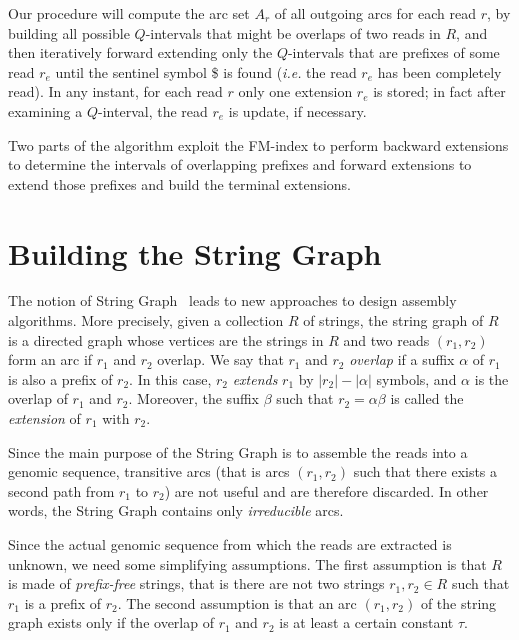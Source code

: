 \documentclass[runningheads,envcountsame,a4paper]{llncs}
\newcommand{\ie}{\textit{i.e.}\xspace}
\begin{document}

Our procedure will compute the arc set $A_r$ of all outgoing arcs for each read $r$,
by building all possible $Q$-intervals that might be overlaps of two
reads in $R$, and then iteratively forward extending only the $Q$-intervals that
are prefixes of some read $r_{e}$ until the sentinel symbol \$ is
found (\ie the read $r_{e}$ has been completely read).
In any instant, for each read $r$ only one extension $r_{e}$ is stored; in fact after examining a $Q$-interval, the read $r_{e}$ is update, if necessary.



Two parts of the algorithm exploit the FM-index to perform
backward extensions to determine the intervals of overlapping
prefixes and forward extensions to extend those prefixes and build the
terminal extensions.


\section*{Building the String Graph}

The notion of String Graph~\cite{Simpson2010} leads to new approaches to design assembly algorithms.
More precisely, given a collection $R$ of strings, the string graph of $R$ is a directed graph whose vertices are the strings in $R$ and two reads $(r_{1}, r_{2})$ form an arc if $r_{1}$ and $r_{2}$ overlap.
We say that $r_1$ and $r_2$
\emph{overlap} if a suffix $\alpha$ of $r_1$ is also a prefix of $r_2$.
In this case,
$r_2$ \emph{extends} $r_1$ by $|r_2|- |\alpha|$ symbols, and $\alpha$ is the overlap of $r_{1}$ and $r_{2}$.
Moreover,
the suffix $\beta$ such that $r_2 = \alpha \beta$ is called the
\emph{extension} of $r_1$ with $r_{2}$.

Since the main purpose of the String Graph is to assemble the reads into a genomic sequence, transitive arcs (that is arcs $(r_{1}, r_{2})$ such that there exists a second path from $r_{1}$ to $r_{2}$) are not useful and are therefore discarded.
In other words, the String Graph contains only \emph{irreducible} arcs.


Since the actual genomic sequence from which the reads are extracted is unknown, we need some simplifying assumptions.
The first assumption is that $R$ is made of \emph{prefix-free} strings, that is there are not two strings $r_{1}, r_{2}\in R$ such that
$r_{1}$  is a prefix of  $r_{2}$.
The second assumption is that an arc $(r_{1}, r_{2})$ of the string graph exists only if the overlap of $r_{1}$ and $r_{2}$ is at least a certain constant $\tau$.
\end{document}
